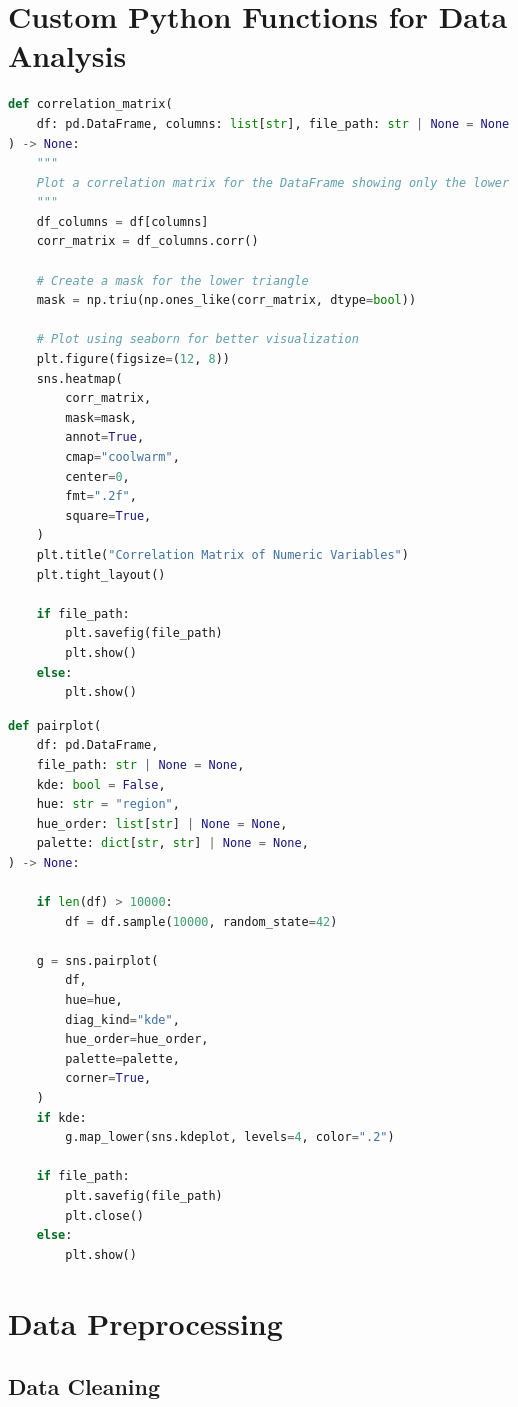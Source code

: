 \documentclass[11pt,english,a4paper,hidelinks]{book}
\begin{document}
\section{Custom Python Functions for Data Analysis}
\label{app:custom_functions}

\begin{lstlisting}[language=Python, caption=Correlation Matrix Plot Function]
def correlation_matrix(
    df: pd.DataFrame, columns: list[str], file_path: str | None = None
) -> None:
    """
    Plot a correlation matrix for the DataFrame showing only the lower triangle.
    """
    df_columns = df[columns]
    corr_matrix = df_columns.corr()

    # Create a mask for the lower triangle
    mask = np.triu(np.ones_like(corr_matrix, dtype=bool))

    # Plot using seaborn for better visualization
    plt.figure(figsize=(12, 8))
    sns.heatmap(
        corr_matrix,
        mask=mask,
        annot=True,
        cmap="coolwarm",
        center=0,
        fmt=".2f",
        square=True,
    )
    plt.title("Correlation Matrix of Numeric Variables")
    plt.tight_layout()

    if file_path:
        plt.savefig(file_path)
        plt.show()
    else:
        plt.show()
\end{lstlisting}

\begin{lstlisting}[language=Python, caption=Custom Pairplot Function]
def pairplot(
    df: pd.DataFrame,
    file_path: str | None = None,
    kde: bool = False,
    hue: str = "region",
    hue_order: list[str] | None = None,
    palette: dict[str, str] | None = None,
) -> None:

    if len(df) > 10000:
        df = df.sample(10000, random_state=42)

    g = sns.pairplot(
        df,
        hue=hue,
        diag_kind="kde",
        hue_order=hue_order,
        palette=palette,
        corner=True,
    )
    if kde:
        g.map_lower(sns.kdeplot, levels=4, color=".2")

    if file_path:
        plt.savefig(file_path)
        plt.close()
    else:
        plt.show()
\end{lstlisting}


\section{Data Preprocessing}

\subsection{Data Cleaning}
\end{document}
